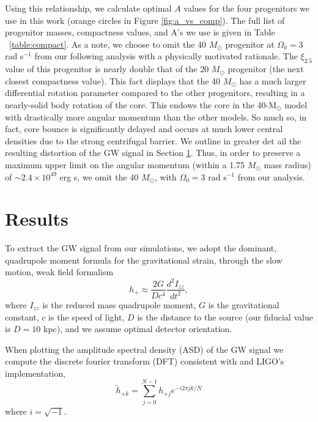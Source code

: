 \documentclass[twocolumn,times]{aastex62}  %
\newcommand{\Msun}{\ensuremath{\mathrm{M}_\odot}\xspace}
\begin{document}
Using this relationship, we calculate optimal $A$ values for the four \citet{Suk:2016} progenitors we use in this work (orange circles in Figure \ref{fig:a_vs_comp}).  
The full list of progenitor masses, compactness values, and A's we use is given in Table ~\ref{table:compact}.  
As a note, we choose to omit the 40 $M_\odot$ progenitor at $\Omega_0 = 3$ rad s$^{-1}$ from our following analysis with a physically motivated rationale.  The $\xi_{2.5}$ value of this progenitor is nearly double that of the 20 $M_\odot$ progenitor (the next closest compactness value).  This fact displays that the 40 $M_\odot$ has a much larger differential rotation parameter compared to the other progenitors, resulting in a nearly-solid body rotation of the core. This endows the core in the 40-\Msun model with drastically more angular momentum than the other models.  
So much so, in fact, core bounce is significantly delayed and occurs at much lower central densities due to the strong centrifugal barrier.
We outline in greater det ail the resulting distortion of the GW signal in Section \ref{sec:results}.  Thus, in order to preserve a maximum upper limit on the angular momentum (within a 1.75 $M_\odot$ mass radius) of $\sim 2.4\times 10^{49}$ erg s, we omit the 40 $M_\odot$, with $\Omega_0 = 3$ rad s$^{-1}$ from our analysis.  \\




%


\section{Results}
\label{sec:results}

To extract the GW signal from our simulations, we adopt the dominant, quadrupole moment formula for the gravitational strain, through the slow motion, weak field formalism %
\citep[eg.][]{finn:1990,blanchet:1990}
\begin{equation}
    h_+ \approx \frac{2G}{Dc^4}
    \frac{d^2I_{zz}}{dt^2},
\label{eq:quad}
\end{equation}
where $I_{zz}$ is the reduced mass quadrupole moment, $G$ is the gravitational constant, $c$ is the speed of light, $D$ is the distance to the source (our fiducial value is $D=10$ kpc), and we assume optimal detector orientation.\\
\par When plotting the amplitude spectral density (ASD) of the GW signal we compute the discrete fourier transform (DFT) consistent with \citet{anderson:2004} and LIGO's implementation,
\begin{equation}
\widetilde{h}_{+k} = \sum^{N-1}_{j=0} h_{+j} e^{-i2\pi jk/N}
\label{eq:dft}
\end{equation}
where $i=\sqrt{-1}$.
\end{document}
